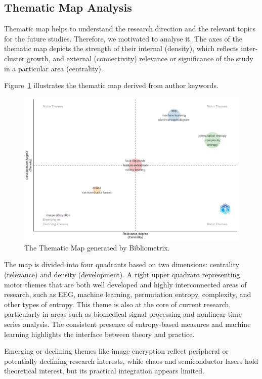 \subsection{Thematic Map Analysis}

Thematic map helps to understand the research direction and the relevant topics for the future studies. Therefore, we motivated to analyse it. The axes of the thematic map depicts the strength of their internal (density), which reflects inter-cluster growth, and external (connectivity) relevance or significance of the study in a particular area (centrality). 

Figure~\ref{fig:ThematicMap} illustrates the thematic map derived from author keywords.

\begin{figure}[H]
	\centering
	\includegraphics[width=\textwidth]{ThematicMap-2025-06-20}
	\caption{The Thematic Map generated by Bibliometrix.}
	\label{fig:ThematicMap}
\end{figure}

The map is divided into four quadrants based on two dimensions: centrality (relevance) and density (development). 
A right upper quadrant representing motor themes that are both well developed and highly interconnected areas of research, such as EEG, machine learning, permutation entropy, complexity, and other types of entropy. This theme is also at the core of current research, particularly in areas such as biomedical signal processing and nonlinear time series analysis. The consistent presence of entropy-based measures and machine learning highlights the interface between theory and practice.

Emerging or declining themes like image encryption reflect peripheral or potentially declining research interests, while chaos and semiconductor lasers hold theoretical interest, but its practical integration appears limited.  


